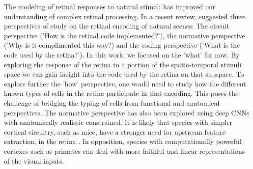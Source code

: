 The modeling of retinal responses to natural stimuli has improved our
understanding of complex retinal processing. In a recent review, \citep{karamanlis_retinal_2022} suggested three perspectives of study on the
retinal
encoding of natural scenes: The circuit perspective ('How is the retinal code
implemented?'), the normative perspective ('Why is it complimented this way?)
and the coding perspective ('What is the code used by the retina?'). In this
work, we focused on the 'what' for now. By exploring the response of the retina
to a portion of
the spatio-temporal stimuli space we can gain insight into the code used by the
retina on that subspace. To explore further the 'how' perspective, one would
need to study how the different known types of cells in the retina participate
in that encoding. This poses the challenge of bridging the typing of cells from
functional and anatomical perspectives.
The normative perspective has also been explored using deep CNNs with
anatomically realistic constrained. It is likely that species with simpler
cortical circuitry, such as mice, have a stronger need for upstream feature
extraction, in the retina \citep{lindsey_unified_2019}. In opposition, species with computationally powerful
cortexes such as primates can deal with more faithful and linear
representations
of the visual inputs.

\clearpage